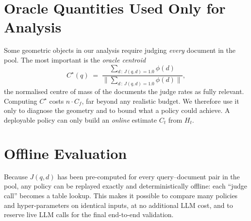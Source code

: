 \section{Oracle Quantities Used Only for Analysis}

Some geometric objects in our analysis require judging \emph{every} document in the pool. The most important is the \emph{oracle centroid}
\begin{equation}
  C^\star(q) \;=\; \frac{\sum_{d\,:\,J(q,d)=1.0}\phi(d)}{\bigl\|\sum_{d\,:\,J(q,d)=1.0}\phi(d)\bigr\|},
\end{equation}
the normalised centre of mass of the documents the judge rates as fully relevant. Computing $C^\star$ costs $n\cdot C_f$, far beyond any realistic budget. We therefore use it only to diagnose the geometry and to bound what a policy could achieve. A deployable policy can only build an \emph{online} estimate $C_t$ from $H_t$.

\section{Offline Evaluation}

Because $J(q,d)$ has been pre-computed for every query--document pair in the pool, any policy can be replayed exactly and deterministically offline: each ``judge call'' becomes a table lookup. This makes it possible to compare many policies and hyper-parameters on identical inputs, at no additional LLM cost, and to reserve live LLM calls for the final end-to-end validation.
